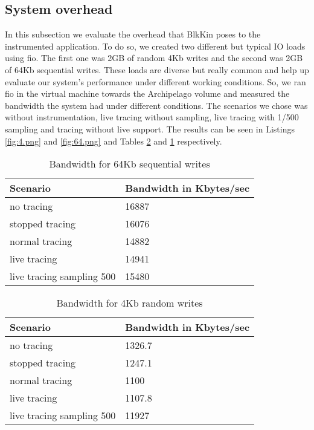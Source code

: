\subsection{System overhead}
In this subsection we evaluate the overhead that BlkKin poses to the
instrumented application. To do so, we created two different but typical IO
loads using fio. The first one was 2GB of random 4Kb writes and the second was
2GB of 64Kb sequential writes. These loads are diverse but really common and
help up evaluate our system's performance under different working conditions.
So, we ran fio in the virtual machine towards the Archipelago volume and
measured the bandwidth the system had under different conditions. The scenarios
we chose was without instrumentation, live tracing without sampling, live
tracing with 1/500 sampling and tracing without live support. The results can
be seen in Listings \ref{fig:4.png} and \ref{fig:64.png} and Tables
\ref{tab:4k-random} and \ref{tab:64k-sequential} respectively.


\begin{table}[H]
    \centering
    \begin{tabular}{ | l | l | }
        \hline
        Scenario  & Bandwidth in Kbytes/sec  \\ \hline \hline
        no tracing & 16887  \\ \hline
        stopped tracing & 16076 \\ \hline
        normal tracing & 14882  \\ \hline
        live tracing & 14941  \\ \hline
        live tracing sampling 500 & 15480  \\ \hline
    \end{tabular}
    \caption{Bandwidth for 64Kb sequential writes}
    \label{tab:64k-sequential}
\end{table}

\begin{table}[H]
    \centering
    \begin{tabular}{ | l | l | }
        \hline
        Scenario  & Bandwidth in Kbytes/sec  \\ \hline \hline
        no tracing & 1326.7  \\ \hline
        stopped tracing & 1247.1 \\ \hline
        normal tracing & 1100 \\ \hline
        live tracing & 1107.8  \\ \hline
        live tracing sampling 500 & 11927  \\ \hline
    \end{tabular}
    \caption{Bandwidth for 4Kb random writes}
    \label{tab:4k-random}
\end{table}

